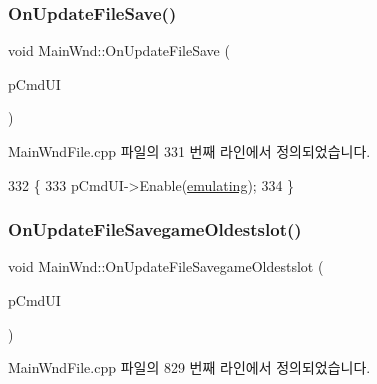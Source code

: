 \subsubsection{\texorpdfstring{On\+Update\+File\+Save()}{OnUpdateFileSave()}}
{\footnotesize\ttfamily void Main\+Wnd\+::\+On\+Update\+File\+Save (\begin{DoxyParamCaption}\item[{C\+Cmd\+UI $\ast$}]{p\+Cmd\+UI }\end{DoxyParamCaption})\hspace{0.3cm}{\ttfamily [protected]}}



Main\+Wnd\+File.\+cpp 파일의 331 번째 라인에서 정의되었습니다.


\begin{DoxyCode}
332 \{
333   pCmdUI->Enable(\mbox{\hyperlink{_main_wnd_file_8cpp_af9cc36078b1b311753963297ae7f2a74}{emulating}});
334 \}
\end{DoxyCode}
\mbox{\label{class_main_wnd_ac037eba8953facb1e191ad0b4bb6ff39}} 
\subsubsection{\texorpdfstring{On\+Update\+File\+Savegame\+Oldestslot()}{OnUpdateFileSavegameOldestslot()}}
{\footnotesize\ttfamily void Main\+Wnd\+::\+On\+Update\+File\+Savegame\+Oldestslot (\begin{DoxyParamCaption}\item[{C\+Cmd\+UI $\ast$}]{p\+Cmd\+UI }\end{DoxyParamCaption})\hspace{0.3cm}{\ttfamily [protected]}}



Main\+Wnd\+File.\+cpp 파일의 829 번째 라인에서 정의되었습니다.


